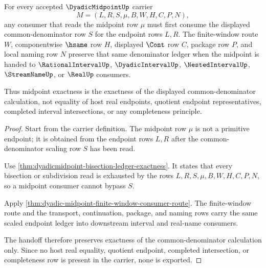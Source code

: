 \begin{theorem}
\label{thm:dyadic-midpoint-common-denominator-consumer-exactness}
For every accepted $\DyadicMidpointUp$ carrier
$$
M=(L,R,S,\mu,B,W,H,C,P,N),
$$
any consumer that reads the midpoint row $\mu$ must first consume the displayed common-denominator row $S$ for the endpoint rows $L,R$. The finite-window route $W$, componentwise $\hsame$ row $H$, displayed $\Cont$ row $C$, package row $P$, and local naming row $N$ preserve that same denominator ledger when the midpoint is handed to $\RationalIntervalUp$, $\DyadicIntervalUp$, $\NestedIntervalUp$, $\StreamNameUp$, or $\RealUp$ consumers.

Thus midpoint exactness is the exactness of the displayed common-denominator calculation, not equality of host real endpoints, quotient endpoint representatives, completed interval intersections, or any completeness principle.
\end{theorem}
\begin{proof}
Start from the carrier definition. The midpoint row $\mu$ is not a primitive endpoint; it is obtained from the endpoint rows $L,R$ after the common-denominator scaling row $S$ has been read.

Use \autoref{thm:dyadicmidpoint-bisection-ledger-exactness}. It states that every bisection or subdivision read is exhausted by the rows $L,R,S,\mu,B,W,H,C,P,N$, so a midpoint consumer cannot bypass $S$.

Apply \autoref{thm:dyadic-midpoint-finite-window-consumer-route}. The finite-window route and the transport, continuation, package, and naming rows carry the same scaled endpoint ledger into downstream interval and real-name consumers.

The handoff therefore preserves exactness of the common-denominator calculation only. Since no host real equality, quotient endpoint, completed intersection, or completeness row is present in the carrier, none is exported.
\end{proof}

